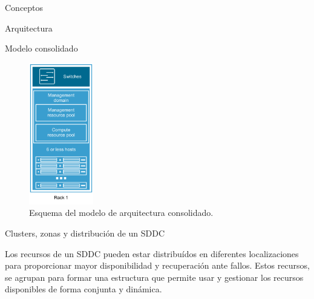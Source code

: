 \begin{section}{Conceptos}
\begin{subsection}{Arquitectura}
\begin{subsubsection}{Modelo consolidado}

\begin{figure}[h!]
  \centering
  \includegraphics[width=0.25\textwidth]{imaxes/conceptosPrevios/modelConsolidated.png}
  \caption{Esquema del modelo de arquitectura consolidado.}
  \label{fig:modeloconsolidated}
\end{figure}

\FloatBarrier

\end{subsubsection}
\end{subsection}

\begin{subsection}{Clusters, zonas y distribución de un SDDC}

  Los recursos de un SDDC pueden estar distribuídos en diferentes localizaciones para proporcionar mayor disponibilidad y recuperación ante fallos. Estos recursos, se agrupan para formar una estructura que permite usar y gestionar los recursos disponibles de forma conjunta y dinámica.


\end{subsection}
\end{section}
